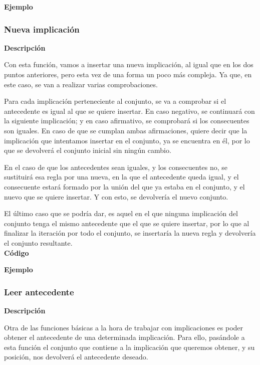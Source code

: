     \textbf{Ejemplo}



\subsubsection{Nueva implicaci\'on}

    \textbf{Descripci\'on}

    Con esta funci\'on, vamos a insertar una nueva implicaci\'on, al igual que en los dos puntos anteriores, pero esta vez 
    de una forma un poco m\'as compleja. Ya que, en este caso, se van a realizar varias comprobaciones.

    Para cada implicaci\'on perteneciente al conjunto, se va a comprobar si el antecedente es igual al que se quiere insertar.
    En caso negativo, se continuar\'a con la siguiente implicaci\'on; y en caso afirmativo, se comprobar\'a si los consecuentes son 
    iguales. En caso de que se cumplan ambas afirmaciones, quiere decir que la implicaci\'on que intentamos insertar en el conjunto, 
    ya se encuentra en \'el, por lo que se devolver\'a el conjunto inicial sin ning\'un cambio.

    En el caso de que los antecedentes sean iguales, y los consecuentes no, se sustituir\'a esa regla por una nueva, en la que el antecedente 
    queda igual, y el consecuente estar\'a formado por la uni\'on del que ya estaba en el conjunto, y el nuevo que se quiere insertar. Y con 
    esto, se devolver\'ia el nuevo conjunto.

    El \'ultimo caso que se podr\'ia dar, es aquel en el que ninguna implicaci\'on del conjunto tenga el mismo antecedente que el que se 
    quiere insertar, por lo que al finalizar la iteraci\'on por todo el conjunto, se insertar\'ia la nueva regla y devolver\'ia el conjunto 
    resultante.
    \\


    \textbf{C\'odigo}

    


    \textbf{Ejemplo}


\subsubsection{Leer antecedente}

    \textbf{Descripci\'on}

    Otra de las funciones b\'asicas a la hora de trabajar con implicaciones es poder obtener el antecedente de una determinada 
    implicaci\'on. Para ello, pas\'andole a esta funci\'on el conjunto que contiene a la implicaci\'on que queremos obtener, y su 
    posici\'on, nos devolver\'a el antecedente deseado.
    \\


